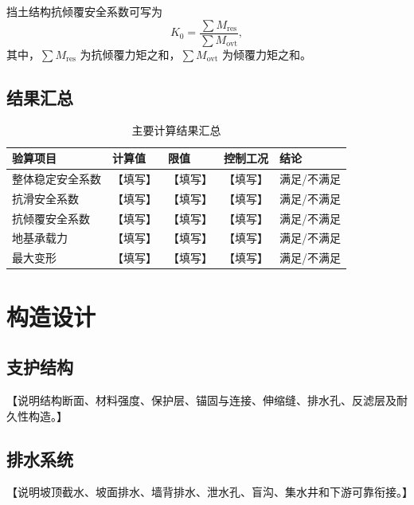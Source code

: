 \documentclass[UTF8,zihao=-4,oneside]{ctexrep}
\newcommand{\placeholder}[1]{\textcolor{documentblack}{【#1】}}
\begin{document}
挡土结构抗倾覆安全系数可写为
\begin{equation}
  K_0=\frac{\sum M_{\mathrm{res}}}{\sum M_{\mathrm{ovt}}},
  \label{eq:overturning}
\end{equation}
其中，$\sum M_{\mathrm{res}}$ 为抗倾覆力矩之和，$\sum M_{\mathrm{ovt}}$ 为倾覆力矩之和。

\section{结果汇总}
\begin{table}[H]
  \centering
  \caption{主要计算结果汇总}
  \label{tab:results}
  \begin{tabularx}{\textwidth}{p{35mm}p{28mm}p{28mm}Xp{22mm}}
    \toprule
    验算项目 & 计算值 & 限值 & 控制工况 & 结论 \\
    \midrule
    整体稳定安全系数 & \placeholder{填写} & \placeholder{填写} & \placeholder{填写} & 满足/不满足 \\
    抗滑安全系数 & \placeholder{填写} & \placeholder{填写} & \placeholder{填写} & 满足/不满足 \\
    抗倾覆安全系数 & \placeholder{填写} & \placeholder{填写} & \placeholder{填写} & 满足/不满足 \\
    地基承载力 & \placeholder{填写} & \placeholder{填写} & \placeholder{填写} & 满足/不满足 \\
    最大变形 & \placeholder{填写} & \placeholder{填写} & \placeholder{填写} & 满足/不满足 \\
    \bottomrule
  \end{tabularx}
\end{table}

\chapter{构造设计}

\section{支护结构}
\placeholder{说明结构断面、材料强度、保护层、锚固与连接、伸缩缝、排水孔、反滤层及耐久性构造。}

\section{排水系统}
\placeholder{说明坡顶截水、坡面排水、墙背排水、泄水孔、盲沟、集水井和下游可靠衔接。}
\end{document}

